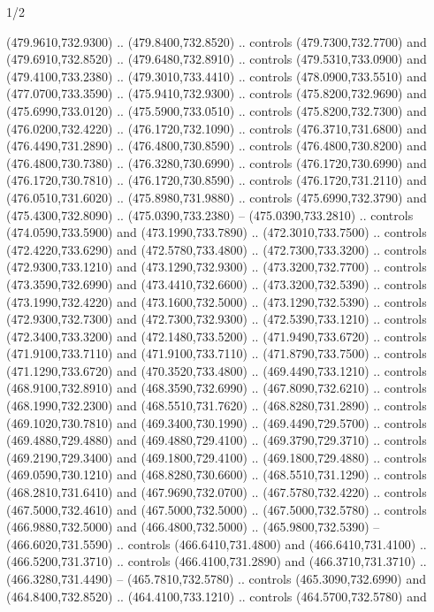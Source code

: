 \begin{flagdescription}{1/2}
\begin{scope}[xshift=0.5\flaglength]
\begin{scope}[scale=0.00745\flagwidth,xshift=-12.1mm,yshift=41.7mm]
\begin{scope}[y=0.80pt, x=0.80pt, yscale=-1, xscale=1, inner sep=0pt, outer sep=0pt]
\begin{scope}[cm={{1.33333,0.0,0.0,-1.33333,(0.0,114.66667)}}]
\begin{scope}[scale=0.100]
  (479.9610,732.9300) .. (479.8400,732.8520) .. controls (479.7300,732.7700) and
  (479.6910,732.8520) .. (479.6480,732.8910) .. controls (479.5310,733.0900) and
  (479.4100,733.2380) .. (479.3010,733.4410) .. controls (478.0900,733.5510) and
  (477.0700,733.3590) .. (475.9410,732.9300) .. controls (475.8200,732.9690) and
  (475.6990,733.0120) .. (475.5900,733.0510) .. controls (475.8200,732.7300) and
  (476.0200,732.4220) .. (476.1720,732.1090) .. controls (476.3710,731.6800) and
  (476.4490,731.2890) .. (476.4800,730.8590) .. controls (476.4800,730.8200) and
  (476.4800,730.7380) .. (476.3280,730.6990) .. controls (476.1720,730.6990) and
  (476.1720,730.7810) .. (476.1720,730.8590) .. controls (476.1720,731.2110) and
  (476.0510,731.6020) .. (475.8980,731.9880) .. controls (475.6990,732.3790) and
  (475.4300,732.8090) .. (475.0390,733.2380) -- (475.0390,733.2810) .. controls
  (474.0590,733.5900) and (473.1990,733.7890) .. (472.3010,733.7500) .. controls
  (472.4220,733.6290) and (472.5780,733.4800) .. (472.7300,733.3200) .. controls
  (472.9300,733.1210) and (473.1290,732.9300) .. (473.3200,732.7700) .. controls
  (473.3590,732.6990) and (473.4410,732.6600) .. (473.3200,732.5390) .. controls
  (473.1990,732.4220) and (473.1600,732.5000) .. (473.1290,732.5390) .. controls
  (472.9300,732.7300) and (472.7300,732.9300) .. (472.5390,733.1210) .. controls
  (472.3400,733.3200) and (472.1480,733.5200) .. (471.9490,733.6720) .. controls
  (471.9100,733.7110) and (471.9100,733.7110) .. (471.8790,733.7500) .. controls
  (471.1290,733.6720) and (470.3520,733.4800) .. (469.4490,733.1210) .. controls
  (468.9100,732.8910) and (468.3590,732.6990) .. (467.8090,732.6210) .. controls
  (468.1990,732.2300) and (468.5510,731.7620) .. (468.8280,731.2890) .. controls
  (469.1020,730.7810) and (469.3400,730.1990) .. (469.4490,729.5700) .. controls
  (469.4880,729.4880) and (469.4880,729.4100) .. (469.3790,729.3710) .. controls
  (469.2190,729.3400) and (469.1800,729.4100) .. (469.1800,729.4880) .. controls
  (469.0590,730.1210) and (468.8280,730.6600) .. (468.5510,731.1290) .. controls
  (468.2810,731.6410) and (467.9690,732.0700) .. (467.5780,732.4220) .. controls
  (467.5000,732.4610) and (467.5000,732.5000) .. (467.5000,732.5780) .. controls
  (466.9880,732.5000) and (466.4800,732.5000) .. (465.9800,732.5390) --
  (466.6020,731.5590) .. controls (466.6410,731.4800) and (466.6410,731.4100) ..
  (466.5200,731.3710) .. controls (466.4100,731.2890) and (466.3710,731.3710) ..
  (466.3280,731.4490) -- (465.7810,732.5780) .. controls (465.3090,732.6990) and
  (464.8400,732.8520) .. (464.4100,733.1210) .. controls (464.5700,732.5780) and

\end{scope}
\end{scope}
\end{scope}
\end{scope}
\end{scope}
\end{flagdescription}
